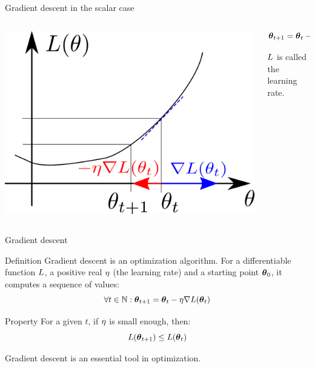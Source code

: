 \documentclass[xcolor=pdftex,dvipsnames,table,mathserif]{beamer}
\begin{document}



\begin{frame}{Gradient descent in the scalar case}

  \begin{columns}
    \begin{column}{.5\textwidth}
      \includegraphics[width=\textwidth]{gradient_descent}
    \end{column}

    \begin{column}{.5\textwidth}
      \[
      \boldsymbol{\theta}_{t+1} = \boldsymbol{\theta}_t - \eta\nabla L(\boldsymbol{\theta}_t)
      \]

      $L$ is called the \alert{learning rate}.
    \end{column}
  \end{columns}

\end{frame}

\begin{frame}{Gradient descent}

  \begin{block}{Definition}
    Gradient descent is an optimization algorithm. For a differentiable function $L$, a positive real $\eta$ (the \alert{learning rate}) and a starting point $\boldsymbol{\theta}_0$, it computes a sequence of values:
    \[
    \forall t \in \mathbb{N}: \boldsymbol{\theta}_{t+1} = \boldsymbol{\theta}_t - \eta \nabla L(\boldsymbol{\theta}_t)
    \]
  \end{block}

  \begin{block}{Property}
    For a given $t$, if $\eta$ is small enough, then:
    \[
    L(\boldsymbol{\theta}_{t+1}) \leq L(\boldsymbol{\theta}_t)
    \]
  \end{block}

  Gradient descent is an essential tool in optimization.

\end{frame}
\end{document}
